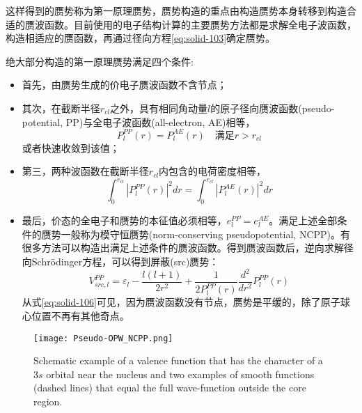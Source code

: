 这样得到的赝势称为第一原理赝势，赝势构造的重点由构造赝势本身转移到构造合适的赝波函数。目前使用的电子结构计算的主要赝势方法都是求解全电子波函数，构造相适应的赝函数，再通过径向方程\eqref{eq:solid-103}确定赝势。

绝大部分构造的第一原理赝势满足四个条件\cite{PRB12-4200_1975,PRB18-5449_1978,PRB19-568_1979,PRB20-4082_1979,PRB26-4199_1982,PRL43-1494_1979,JPC13-L189_1980,PRB32-8412_1985,PRB43-1993_1991}:
\begin{itemize}
	\item 首先，由赝势生成的价电子赝波函数不含节点；
	\item 其次，在截断半径$r_{cl}$之外\cite{JPC13-L189_1980,PRB43-1993_1991}，具有相同角动量$l$的原子径向赝波函数(pseudo-potential, PP)与全电子波函数(all-electron, AE)相等，%
\begin{equation}
  P_l^{PP}(r)=P_l^{AE}(r)\quad \mbox{满足}r>r_{cl}
  \label{eq:solid-104}
\end{equation}
或者快速收敛到该值\cite{PRB18-5449_1978,PRL43-1494_1979,PRB32-8412_1985}；
	\item 第三，两种波函数在截断半径$r_{cl}$内包含的电荷密度相等\cite{PRL43-1494_1979,PRB43-1993_1991}，
\begin{equation}
  \int_0^{r_{cl}}|P_l^{PP}(r)|^2dr=\int_0^{r_{cl}}|P_l^{AE}(r)|^2dr
  \label{eq:solid-105}
\end{equation}
	\item 最后，价态的全电子和赝势的本征值必须相等，$e_l^{PP}=e_l^{AE}$。满足上述全部条件的赝势一般称为模守恒赝势(norm-conserving pseudopotential, NCPP)\cite{PRL43-1494_1979}。有很多方法可以构造出满足上述条件的赝波函数\cite{PRB18-5449_1978,PRB26-4199_1982,PRL43-1494_1979,JPC13-L189_1980,PRB32-8412_1985,PRB43-1993_1991}。得到赝波函数后，逆向求解径向Schr\"odinger方程，可以得到屏蔽(src)赝势：
\begin{equation}
  V_{src,l}^{PP}=\varepsilon_l-\frac{l(l+1)}{2r^2}+\frac1{2P_l^{PP}(r)}\frac{d^2}{dr^2}P_l^{PP}(r)
  \label{eq:solid-106}
\end{equation}
从式\eqref{eq:solid-106}可见，因为赝波函数没有节点，赝势是平缓的，除了原子球心位置不再有其他奇点。
\end{itemize}
\begin{figure}[h!]
\centering
\vspace*{-0.10in}
\texttt{[image: Pseudo-OPW\_NCPP.png]}
\caption{\small \textrm{Schematic example of a valence function that has the character of a $3s$ orbital near the nucleus and two examples of smooth functions (dashed lines) that equal the full wave-function outside the core region.}}%
\label{Pseudo-OPW_NCPP}
\end{figure}
